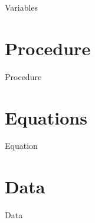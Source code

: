 \documentclass[12pt, a4paper]{article}
\begin{document}
        {Variables}
        
\section{{Procedure}}
        
        {Procedure}

        
        
        
\section{{Equations}}
        
        {Equation}

\section{{Data}}

	  {Data}      
        
        
        
        
        
        
        
        
\end{document}
